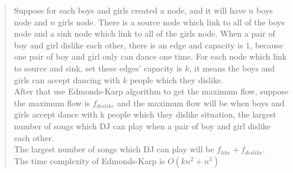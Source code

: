 \documentclass{article}
\begin{document}
\begin{Question}
\begin{Subquestion}
\begin{answer}
\begin{quote}
    Suppose for each boys and girls created a node, and it will have  $n$ boys node and $n$ girls node. There is a source node which link to all of the boys node and a sink node which link to all of the girls node. When a pair of boy and girl dislike each other, there is an edge and capacity is $1$, because one pair of boy and girl only can dance one time. For each node which link to source and sink, set these edges' capacity is $k$, it means the boys and girls can accept dancing with $k$ people which they dislike. \\
    After that use Edmonds-Karp algorithm to get the maximum flow, suppose the maximum flow is $f_{dislike}$ and the maximum flow will be when boys and girls accept dance with k people which they dislike situation, the largest number of songs which DJ can play when a pair of boy and girl dislike each other.\\

    The largest number of songs which DJ can play will be $f_{like} + f_{dislike}$.\\
    The time complexity of Edmonds-Karp is $O(kn^2 + n^3)$\\
\end{quote}
\end{answer}
\end{Subquestion}
\end{Question}
\end{document}
